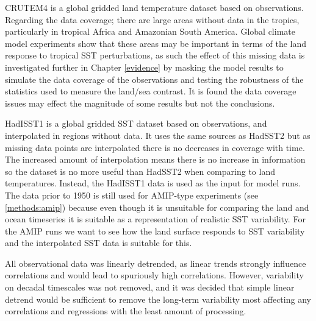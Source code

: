 CRUTEM4 is a global gridded land temperature dataset based on observations.  
Regarding the data coverage; there are large areas without data in the tropics, 
particularly in tropical Africa and Amazonian South America. Global climate 
model experiments show that these areas may be important in terms of the land 
response to tropical SST perturbations, as such the effect of this missing data 
is investigated further in Chapter \ref{evidence} by masking the model results 
to simulate the data coverage of the observations and testing the robustness of 
the statistics used to measure the land/sea contrast. It is found the data 
coverage issues may effect the magnitude of some results but not the 
conclusions.

HadISST1 is a global gridded SST dataset based on observations, and interpolated 
in regions without data. It uses the same sources as HadSST2 but as missing data 
points are interpolated there is no decreases in coverage with time. The 
increased amount of interpolation means there is no increase in information so 
the dataset is no more useful than HadSST2 when comparing to land temperatures.  
Instead, the HadISST1 data is used as the input for model runs. The data prior 
to 1950 is still used for AMIP-type experiments (see \ref{methods:amip}) because 
even though it is unsuitable for comparing the land and ocean timeseries	it 
is suitable as a representation of realistic SST variability. For the AMIP runs 
we want to see how the land surface responds to SST variability and the 
interpolated SST data is suitable for this.

All observational data was linearly detrended, as linear trends strongly 
influence correlations and would lead to spuriously high correlations.  However,
variability on decadal timescales was not removed, and it was decided that 
simple linear detrend would be sufficient to remove the long-term variability 
most affecting any correlations and regressions with the least amount of 
processing.

% 

